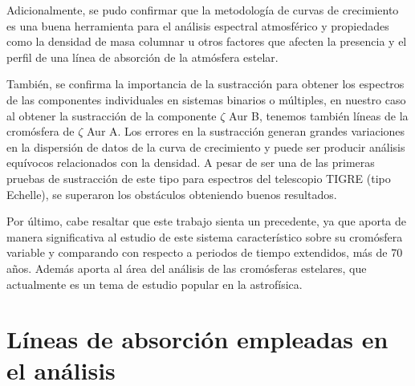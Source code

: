\documentclass[12pt,oneside,openany,letter]{book}
\begin{document}
Adicionalmente, se pudo confirmar que la metodología de curvas de crecimiento es una buena herramienta para el análisis espectral atmosférico y propiedades como la densidad de masa columnar u otros factores que afecten la presencia y el perfil de una línea de absorción de la atmósfera estelar.

También, se confirma la importancia de la sustracción para obtener los espectros de las componentes individuales en sistemas binarios o múltiples, en nuestro caso al obtener la sustracción de la componente $\zeta$ Aur B, tenemos también líneas de la cromósfera de $\zeta$ Aur A. Los errores en la sustracción generan grandes variaciones en la dispersión de datos de la curva de crecimiento y puede ser producir análisis equívocos relacionados con la densidad. A pesar de ser una de las primeras pruebas de sustracción de este tipo para espectros del telescopio TIGRE (tipo Echelle), se superaron los obstáculos obteniendo buenos resultados.

Por último, cabe resaltar que este trabajo sienta un precedente, ya que aporta de manera significativa al estudio de este sistema característico sobre su cromósfera variable y comparando con respecto a periodos de tiempo extendidos, más de 70 años. Además aporta al área del análisis de las cromósferas estelares, que actualmente es un tema de estudio popular en la astrofísica.

\appendix

\chapter{Líneas de absorción empleadas en el análisis}
\end{document}
